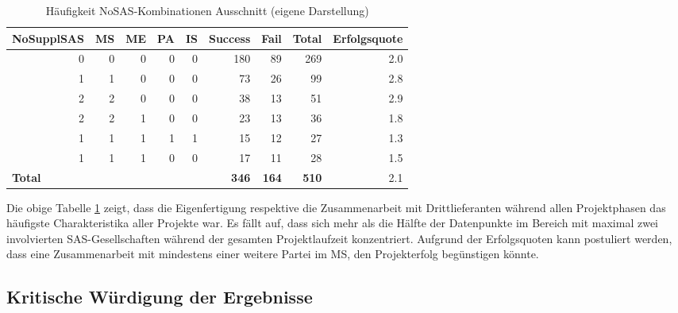 \begin{table}[H]
	\centering
	\caption{Häufigkeit NoSAS-Kombinationen Ausschnitt (eigene Darstellung)}
	\begin{tabular}{lrrrrrrrr}
		\textbf{NoSupplSAS} & \multicolumn{1}{l}{\textbf{MS}} & \multicolumn{1}{l}{\textbf{ME}} & \multicolumn{1}{l}{\textbf{PA}} & \multicolumn{1}{l}{\textbf{IS}} & \multicolumn{1}{l}{\textbf{Success}} & \multicolumn{1}{l}{\textbf{Fail}} & \multicolumn{1}{l}{\textbf{Total}} & \multicolumn{1}{l}{\textbf{Erfolgsquote}} \\ \hline
		\multicolumn{1}{r}{0} & 0     & 0     & 0     & 0     & 180   & 89    & 269 & 2.0 \\
		\multicolumn{1}{r}{1} & 1     & 0     & 0     & 0     & 73    & 26    & 99  & 2.8 \\
		\multicolumn{1}{r}{2} & 2     & 0     & 0     & 0     & 38    & 13    & 51  & 2.9 \\
		\multicolumn{1}{r}{2} & 2     & 1     & 0     & 0     & 23    & 13    & 36  & 1.8 \\
		\multicolumn{1}{r}{1} & 1     & 1     & 1     & 1     & 15    & 12    & 27  & 1.3 \\
		\multicolumn{1}{r}{1} & 1     & 1     & 0     & 0     & 17    & 11    & 28  & 1.5 \\ \hline
		\textbf{Total} &       &       &       &       & \textbf{346} & \textbf{164} & \textbf{510} & 2.1 \\
	\end{tabular}%
	\label{fnosas}%
\end{table}%
Die obige Tabelle \ref{fnosas} zeigt, dass die Eigenfertigung respektive die Zusammenarbeit mit Drittlieferanten während allen Projektphasen das häufigste Charakteristika aller Projekte war. Es fällt auf, dass sich mehr als die Hälfte der Datenpunkte im Bereich mit maximal zwei involvierten SAS-Gesellschaften während der gesamten Projektlaufzeit konzentriert. Aufgrund der Erfolgsquoten kann postuliert werden, dass eine Zusammenarbeit mit mindestens einer weitere Partei im MS, den Projekterfolg begünstigen könnte.
\newpage
\subsection{Kritische Würdigung der Ergebnisse}
\newpage	
	


